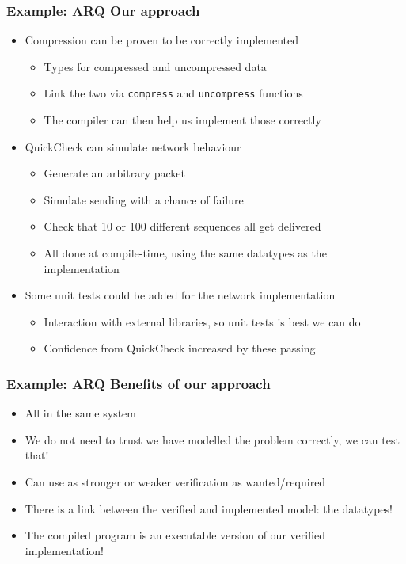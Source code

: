 \documentclass[compress,handout]{beamer}
\begin{document}
\begin{frame}
  \frametitle{Example: ARQ {\textendash} Our approach}

  \begin{itemize}
    \item<1-> Compression can be proven to be correctly implemented
      \begin{itemize}
        \item<2-> Types for compressed and uncompressed data
        \item<3-> Link the two via \texttt{\textasciigrave compress\textasciigrave} and
                  \texttt{\textasciigrave uncompress\textasciigrave} functions
        \item<4-> The compiler can then help us implement those correctly
      \end{itemize}
    \item<5-> QuickCheck can simulate network behaviour
      \begin{itemize}
        \item<6-> Generate an arbitrary packet
        \item<7-> Simulate sending with a chance of failure
        \item<8-> Check that 10 or 100 different sequences all get delivered
        \item<9-> All done at compile-time, using the same datatypes as the
                  implementation
      \end{itemize}
    \item<10-> Some unit tests could be added for the network implementation
      \begin{itemize}
        \item<11-> Interaction with external libraries, so unit tests is best we
                   can do
        \item<12-> Confidence from QuickCheck increased by these passing
      \end{itemize}
  \end{itemize}

\end{frame}


\begin{frame}
  \frametitle{Example: ARQ {\textendash} Benefits of our approach}

  \begin{itemize}
    \item<1-> All in the same system
    \item<2-> We do not need to trust we have modelled the problem correctly, we
              can test that!
    \item<3-> Can use as stronger or weaker verification as wanted/required
    \item<4-> There is a link between the verified and implemented model: the
              datatypes!
    \item<5-> The compiled program is an executable version of our verified
              implementation!
  \end{itemize}

\end{frame}
\end{document}
